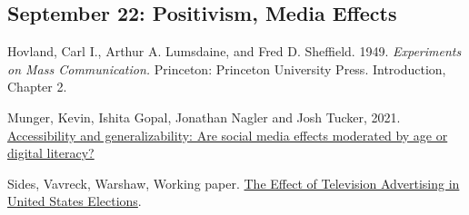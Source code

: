 \vspace{-.1in}\documentclass[11pt]{article}
\begin{document}










\subsection*{September 22: Positivism, Media Effects }


Hovland, Carl I., Arthur A. Lumsdaine, and Fred D. Sheffield. 1949. \emph{Experiments on Mass Communication.} Princeton: Princeton University Press. Introduction, Chapter 2. %


\noindent Munger, Kevin, Ishita Gopal, Jonathan Nagler and Josh Tucker, 2021. \href{https://journals.sagepub.com/doi/pdf/10.1177/20531680211016968}{Accessibility and generalizability: Are social media effects moderated by age or digital literacy?}



\noindent Sides, Vavreck, Warshaw, Working paper. \href{http://chriswarshaw.com/papers/advertising.pdf}{The Effect of Television Advertising in United States Elections}.
\end{document}
